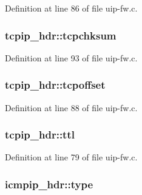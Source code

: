 Definition at line 86 of file uip-\/fw.c.

\hypertarget{group__uipfw_ga711271ced4443aa908b161ccde1a9de4}{
\subsubsection[{tcpchksum}]{ {\bf tcpip\_\-hdr::tcpchksum}}}
\label{group__uipfw_ga711271ced4443aa908b161ccde1a9de4}


Definition at line 93 of file uip-\/fw.c.

\hypertarget{group__uipfw_gaec07fa9add3c0a172516e0ec66810ac4}{
\subsubsection[{tcpoffset}]{ {\bf tcpip\_\-hdr::tcpoffset}}}
\label{group__uipfw_gaec07fa9add3c0a172516e0ec66810ac4}


Definition at line 88 of file uip-\/fw.c.

\hypertarget{group__uipfw_ga23148b00701b22ff693cad8f42e09efb}{
\subsubsection[{ttl}]{ {\bf tcpip\_\-hdr::ttl}}}
\label{group__uipfw_ga23148b00701b22ff693cad8f42e09efb}


Definition at line 79 of file uip-\/fw.c.

\hypertarget{group__uipfw_gacd2da996a99d67c9bd3d19d619206087}{
\subsubsection[{type}]{ {\bf icmpip\_\-hdr::type}}}
\label{group__uipfw_gacd2da996a99d67c9bd3d19d619206087}


